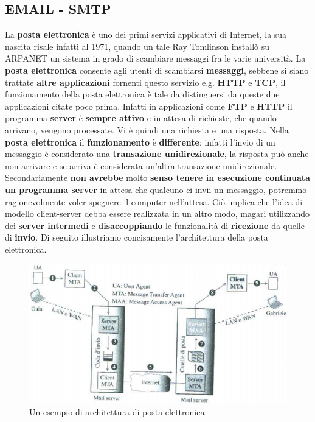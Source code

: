 \documentclass[11pt,a4paper,oneside]{book}
\theoremstyle{definition}
\begin{document}
\pagebreak

\subsection{EMAIL - SMTP}
\label{sec:SMTP}
La \textbf{posta elettronica} è uno dei primi servizi applicativi di Internet, la sua nascita risale infatti al 1971, quando un tale Ray Tomlinson installò su ARPANET un sistema in grado di scambiare messaggi fra le varie università. La \textbf{posta elettronica} consente agli utenti di scambiarsi \textbf{messaggi}, sebbene si siano trattate \textbf{altre applicazioni} fornenti questo servizio e.g. \textbf{HTTP} e \textbf{TCP}, il funzionamento della posta elettronica è tale da distinguersi da queste due applicazioni citate poco prima. Infatti in applicazioni come \textbf{FTP} e \textbf{HTTP} il programma \textbf{server} è \textbf{sempre attivo} e in attesa di richieste, che quando arrivano, vengono processate.
Vi è quindi una richiesta e una risposta. Nella \textbf{posta elettronica} il \textbf{funzionamento} è \textbf{differente}: infatti l'invio di un messaggio è considerato una \textbf{transazione unidirezionale}, la risposta può anche non arrivare e se arriva è considerata un'altra transazione unidirezionale. Secondariamente \textbf{non avrebbe} molto \textbf{senso tenere in esecuzione continuata un programma server} in attesa che qualcuno ci invii un messaggio, potremmo ragionevolmente voler spegnere il computer nell'attesa. Ciò implica che l'idea di modello client-server debba essere realizzata in un altro modo, magari utilizzando dei \textbf{server intermedi} e \textbf{disaccoppiando} le funzionalità di \textbf{ricezione} da quelle di \textbf{invio}. Di seguito illustriamo concisamente l'architettura della posta elettronica.
\begin{figure}[!h]
	\includegraphics[scale=0.45]{Immagini/MAIL.png}
	\centering
	\caption{Un esempio di architettura di posta elettronica.}
\end{figure}\newline
\end{document}
